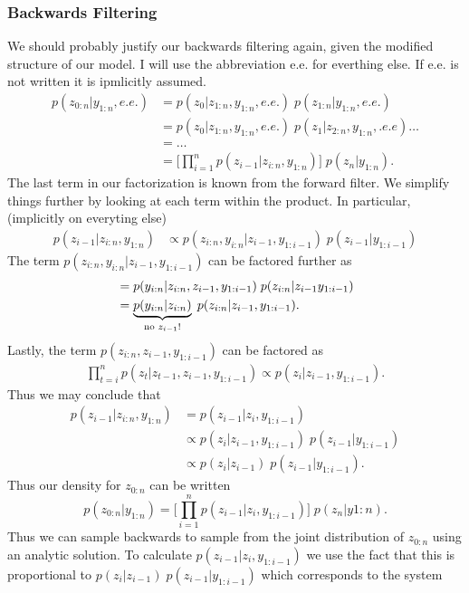 \documentclass{article}
\begin{document}
\subsubsection{Backwards Filtering}
We should probably justify our backwards filtering again, given the modified structure of our model.  I will use the abbreviation e.e. for everthing else.  If e.e. is not written it is ipmlicitly assumed.
\begin{align*}
p(z_{0:n} | y_{1:n}, e.e.) 
& = p(z_0 | z_{1:n}, y_{1:n}, e.e.) \; p(z_{1:n} | y_{1:n}, e.e.) \\
& = p(z_0 | z_{1:n}, y_{1:n}, e.e.) \; p(z_1 | z_{2:n}, y_{1:n}, .e.e) \ldots \\
& = \ldots \\
& = \Big[ \prod_{i=1}^{n} p(z_{i-1} | z_{i:n}, y_{1:n}) \Big] \; p(z_n | y_{1:n}).
\end{align*}
The last term in our factorization is known from the forward filter.  We simplify things further by looking at each term within the product.  In particular, (implicitly on everyting else)
\begin{align*}
p(z_{i-1} | z_{i:n}, y_{1:n})
& \propto p(z_{i:n}, y_{i:n} | z_{i-1}, y_{1:i-1}) \; p(z_{i-1} | y_{1:i-1})
\end{align*}
The term $p(z_{i:n}, y_{i:n} | z_{i-1}, y_{1:i-1})$ can be factored further as
\begin{align*}
& = p(y_{i:n} | z_{i:n}, z_{i-1}, y_{1:i-1}) \; p(z_{i:n} | z_{i-1} y_{1:i-1}) \\
& = \underbrace{ p(y_{i:n} | z_{i:n}) }_{\textmd{no $z_{i-1}$!}} \;
p(z_{i:n} | z_{i-1}, y_{1:i-1}).
\end{align*}
Lastly, the term $p(z_{i:n}, z_{i-1}, y_{1:i-1})$ can be factored as
\begin{align*}
\prod_{t=i}^n p(z_t | z_{t-1}, z_{i-1}, y_{1:i-1}) \propto p(z_i | z_{i-1}, y_{1:i-1}).
\end{align*}
Thus we may conclude that
\begin{align*}
p(z_{i-1} | z_{i:n}, y_{1:n})
& = p(z_{i-1} | z_i, y_{1:i-1}) \\
& \propto p(z_i | z_{i-1}, y_{1:i-1}) \; p(z_{i-1} | y_{1:i-1}) \\
& \propto p(z_i | z_{i-1}) \; p(z_{i-1} | y_{1:i-1}).
\end{align*}
Thus our density for $z_{0:n}$ can be written
\[
p(z_{0:n} | y_{1:n}) = \Big[ \prod_{i=1}^n p(z_{i-1} | z_i, y_{1:i-1}) \Big] \; p(z_n | y{1:n}).
\]
Thus we can sample backwards to sample from the joint distribution of $z_{0:n}$ using an analytic solution.  To calculate $p(z_{i-1} | z_i, y_{1:i-1})$ we use the fact that this is proportional to $p(z_i | z_{i-1}) \; p(z_{i-1} | y_{1:i-1})$ which corresponds to the system
\end{document}
